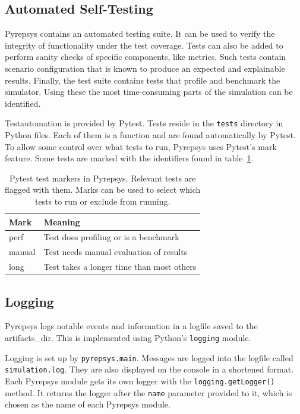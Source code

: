 \documentclass[%
    ]{\PathToTumTemplate/thesis/tum_thesis}
\begin{document}
\subsection{Automated Self-Testing}
Pyrepsys contains an automated testing suite.
It can be used to verify the integrity of functionality under the test coverage.
Tests can also be added to perform sanity checks of specific components, like metrics.
Such tests contain scenario configuration that is known to produce an expected and explainable results.
Finally, the test suite contains tests that profile and benchmark the simulator.
Using these the most time-consuming parts of the simulation can be identified.

Testautomation is provided by Pytest.
Tests reside in the \texttt{tests} directory in Python files.
Each of them is a function and are found automatically by Pytest.
To allow some control over what tests to run, Pyrepsys uses Pytest's mark feature.
Some tests are marked with the identifiers found in table~\ref{tab:pytest_marks}.

\begin{table}[tbp]
\centering
\begin{tabular}{ll}
\toprule
\textbf{Mark}        & \textbf{Meaning} \\ \midrule
perf       & Test does profiling or is a benchmark \\
manual     & Test needs manual evaluation of results \\
long       & Test takes a longer time than most others \\
\bottomrule
\end{tabular}
\caption{
	Pytest test markers in Pyrepsys.
	Relevant tests are flagged with them.
	Marks can be used to select which tests to run or exclude from running.
}
\label{tab:pytest_marks}
\end{table}


\subsection{Logging}
Pyrepsys logs notable events and information in a logfile saved to the \gls{artifacts_dir}.
This is implemented using Python's \lstinline{logging} module.

Logging is set up by \texttt{pyrepsys.main}.
Messages are logged into the logfile called \texttt{simulation.log}.
They are also displayed on the console in a shortened format.
Each Pyrepsys module gets its own logger with the \lstinline{logging.getLogger()} method.
It returns the logger after the \texttt{name} parameter provided to it, which is chosen as the name of each Pyrepsys module.
\end{document}
